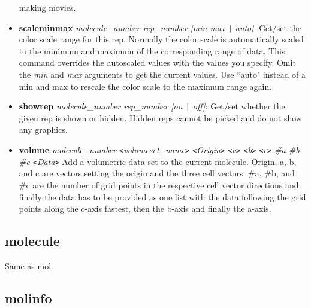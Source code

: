 \begin{itemize}
    making movies.
    \item {\bf scaleminmax} {\it molecule\_number rep\_number [min max {\tt |} auto]}:
    Get/set the color scale range for this rep.  Normally the color scale
    is automatically scaled to the minimum and maximum of the corresponding
    range of data.  This command overrides the autoscaled values with the
    values you specify.  Omit the {\it min} and {\it max} arguments to get
    the current values.  Use ``auto" instead of a min and max to rescale the
    color scale to the maximum range again.
    \item {\bf showrep} {\it molecule\_number rep\_number [on {\tt |} off]}:
    Get/set whether the given rep is shown or hidden.  Hidden reps cannot
    be picked and do not show any graphics.
    \item {\bf volume} {\it molecule\_number {\tt <}volumeset\_name{\tt >} 
       {\tt <}Origin{\tt >}  {\tt <}a{\tt >}  {\tt <}b{\tt >}  {\tt <}c{\tt >}
        \#a \#b \#c  {\tt <}Data{\tt >} }
   Add a volumetric data set to the current molecule. Origin, a, b, and c are 
   vectors setting the origin and the three cell vectors. \#a, \#b, and \#c
   are the number of grid points in the respective cell vector directions and
   finally the data has to be provided as one list with the data following the 
   grid points along the c-axis fastest, then the b-axis and finally the a-axis.
  \end{itemize}


  \subsection{molecule}
Same as mol.

\subsection{molinfo}
\label{ug:topic:molinfo}

